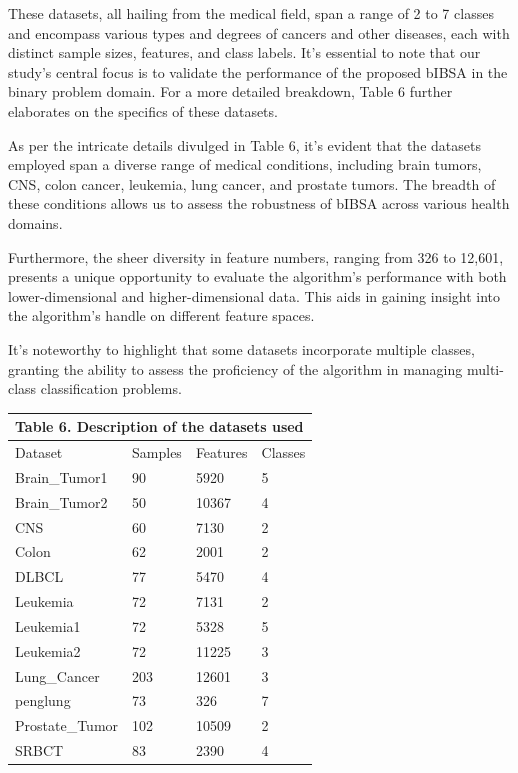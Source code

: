 \documentclass{article} %
\begin{document}
These datasets, all hailing from the medical field, span a range of 2 to 7 classes and encompass various types and degrees of cancers and other diseases, each with distinct sample sizes, features, and class labels. It's essential to note that our study's central focus is to validate the performance of the proposed bIBSA in the binary problem domain. For a more detailed breakdown, Table 6 further elaborates on the specifics of these datasets.

As per the intricate details divulged in Table 6, it's evident that the datasets employed span a diverse range of medical conditions, including brain tumors, CNS, colon cancer, leukemia, lung cancer, and prostate tumors. The breadth of these conditions allows us to assess the robustness of bIBSA across various health domains.

Furthermore, the sheer diversity in feature numbers, ranging from 326 to 12,601, presents a unique opportunity to evaluate the algorithm's performance with both lower-dimensional and higher-dimensional data. This aids in gaining insight into the algorithm's handle on different feature spaces.

It's noteworthy to highlight that some datasets incorporate multiple classes, granting the ability to assess the proficiency of the algorithm in managing multi-class classification problems.

\begin{tabular}{|p{1.0in}|p{1.0in}|p{1.0in}|p{1.0in}|} \hline 
\multicolumn{4}{|p{1in}|}{\textbf{Table }6\textbf{.} Description of the datasets used} \\ \hline 
Dataset & Samples & Features & Classes \\ \hline 
Brain\_Tumor1 & 90 & 5920 & 5 \\ \hline 
Brain\_Tumor2 & 50 & 10367 & 4 \\ \hline 
CNS & 60 & 7130 & 2 \\ \hline 
Colon & 62 & 2001 & 2 \\ \hline 
DLBCL & 77 & 5470 & 4 \\ \hline 
Leukemia & 72 & 7131 & 2 \\ \hline 
Leukemia1 & 72 & 5328 & 5 \\ \hline 
Leukemia2 & 72 & 11225 & 3 \\ \hline 
Lung\_Cancer & 203 & 12601 & 3 \\ \hline 
penglung & 73 & 326 & 7 \\ \hline 
Prostate\_Tumor & 102 & 10509 & 2 \\ \hline 
SRBCT & 83 & 2390 & 4 \\ \hline 
\end{tabular}
\end{document}
